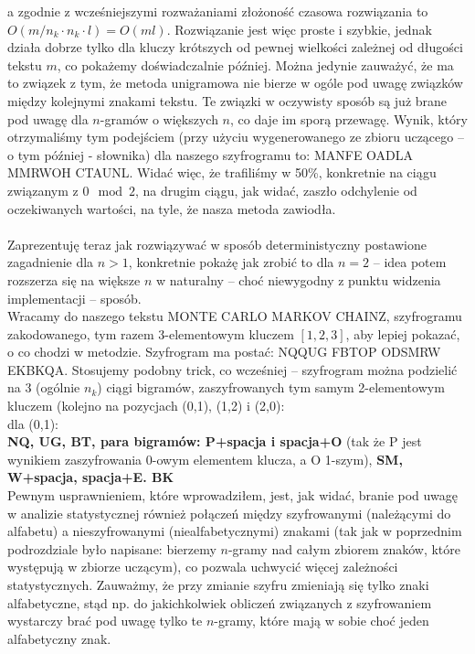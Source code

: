 \documentclass[a4paper]{article}
\begin{document}
a zgodnie z wcześniejszymi rozważaniami złożoność czasowa rozwiązania to $O(m/n_k \cdot n_k \cdot l) = O(ml)$. Rozwiązanie jest więc proste i szybkie, jednak działa dobrze tylko dla kluczy krótszych od pewnej wielkości zależnej od długości tekstu $m$, co pokażemy doświadczalnie później. Można jedynie zauważyć, że ma to związek z tym, że metoda unigramowa nie bierze w ogóle pod uwagę związków między kolejnymi znakami tekstu. Te związki w oczywisty sposób są już brane pod uwagę dla $n$-gramów o większych $n$, co daje im sporą przewagę. Wynik, który otrzymaliśmy tym podejściem (przy użyciu wygenerowanego ze zbioru uczącego – o tym później - słownika) dla naszego szyfrogramu to: MANFE OADLA MMRWOH CTAUNL. Widać więc, że trafiliśmy w 50\%, konkretnie na ciągu związanym z $0 \mod 2$, na drugim ciągu, jak widać, zaszło odchylenie od oczekiwanych wartości, na tyle, że nasza metoda zawiodła.\\\\
Zaprezentuję teraz jak rozwiązywać w sposób deterministyczny postawione zagadnienie dla $n > 1$, konkretnie pokażę jak zrobić to dla $n=2$ – idea potem rozszerza się na większe $n$ w naturalny – choć niewygodny z punktu widzenia implementacji – sposób.\\
Wracamy do naszego tekstu MONTE CARLO MARKOV CHAINZ, szyfrogramu zakodowanego, tym razem 3-elementowym kluczem $[1,2,3]$, aby lepiej pokazać, o co chodzi w metodzie. Szyfrogram ma postać: NQQUG FBTOP ODSMRW EKBKQA. Stosujemy podobny trick, co wcześniej – szyfrogram można podzielić na 3 (ogólnie $n_k$) ciągi bigramów, zaszyfrowanych tym samym 2-elementowym kluczem (kolejno na pozycjach (0,1), (1,2) i (2,0):\\
dla (0,1):\\
\textbf{NQ, UG, BT, para bigramów: P+spacja i spacja+O} (tak że P jest wynikiem zaszyfrowania 0-owym elementem klucza, a O 1-szym), \textbf{SM, W+spacja, spacja+E. BK}\\
Pewnym usprawnieniem, które wprowadziłem, jest, jak widać, branie pod uwagę w analizie statystycznej również połączeń między szyfrowanymi (należącymi do alfabetu) a nieszyfrowanymi (niealfabetycznymi) znakami (tak jak w poprzednim podrozdziale było napisane: bierzemy $n$-gramy nad całym zbiorem znaków, które występują w zbiorze uczącym), co pozwala uchwycić więcej zależności statystycznych. Zauważmy, że przy zmianie szyfru zmieniają się tylko znaki alfabetyczne, stąd np. do jakichkolwiek obliczeń związanych z szyfrowaniem wystarczy brać pod uwagę tylko te $n$-gramy, które mają w sobie choć jeden alfabetyczny znak.
\end{document}
